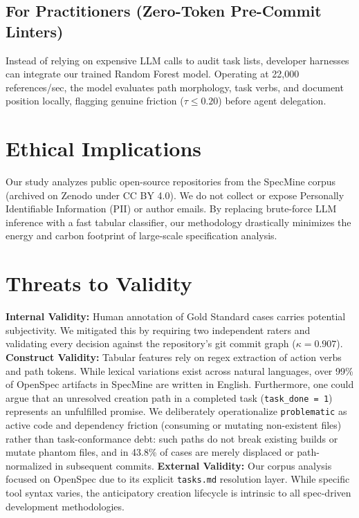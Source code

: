 \documentclass[10pt,conference]{IEEEtran}
\begin{document}
\subsection{For Practitioners (Zero-Token Pre-Commit Linters)}
Instead of relying on expensive LLM calls to audit task lists, developer harnesses can integrate our trained Random Forest model. Operating at 22,000 references/sec, the model evaluates path morphology, task verbs, and document position locally, flagging genuine friction ($\tau \le 0.20$) before agent delegation.

\section{Ethical Implications}
Our study analyzes public open-source repositories from the SpecMine corpus (archived on Zenodo under CC BY 4.0). We do not collect or expose Personally Identifiable Information (PII) or author emails. By replacing brute-force LLM inference with a fast tabular classifier, our methodology drastically minimizes the energy and carbon footprint of large-scale specification analysis.

\section{Threats to Validity}
\textbf{Internal Validity:} Human annotation of Gold Standard cases carries potential subjectivity. We mitigated this by requiring two independent raters and validating every decision against the repository's git commit graph ($\kappa = 0.907$).
\textbf{Construct Validity:} Tabular features rely on regex extraction of action verbs and path tokens. While lexical variations exist across natural languages, over 99\% of OpenSpec artifacts in SpecMine are written in English. Furthermore, one could argue that an unresolved creation path in a completed task (\texttt{task\_done = 1}) represents an unfulfilled promise. We deliberately operationalize \texttt{problematic} as active code and dependency friction (consuming or mutating non-existent files) rather than task-conformance debt: such paths do not break existing builds or mutate phantom files, and in 43.8\% of cases are merely displaced or path-normalized in subsequent commits.
\textbf{External Validity:} Our corpus analysis focused on OpenSpec due to its explicit \texttt{tasks.md} resolution layer. While specific tool syntax varies, the anticipatory creation lifecycle is intrinsic to all spec-driven development methodologies.
\end{document}
